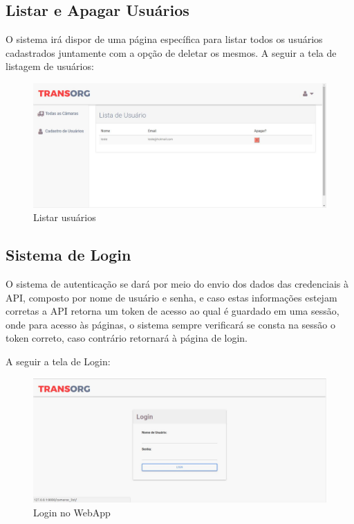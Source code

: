 \subsection{Listar e Apagar Usuários}
	O sistema irá dispor de uma página específica para listar todos os usuários cadastrados juntamente com a opção de deletar os mesmos. A seguir a tela de listagem de usuários:

\begin{figure}[H]
\centering
\includegraphics[width=16cm]{figuras/listaUsuarios_software.JPG}
\caption{Listar usuários}
\end{figure}

\subsection{Sistema de Login}
	O sistema de autenticação se dará por meio do envio dos dados das credenciais à API, composto por nome de usuário e senha, e caso estas informações estejam corretas a API retorna um token de acesso ao qual é guardado em uma sessão, onde para acesso às páginas, o sistema sempre verificará se consta na sessão o token correto, caso contrário retornará à página de login. 
	
	A seguir a tela de Login:

\begin{figure}[H]
\centering
\includegraphics[width=16cm]{figuras/login_software.JPG}
\caption{Login no WebApp}
\end{figure}


